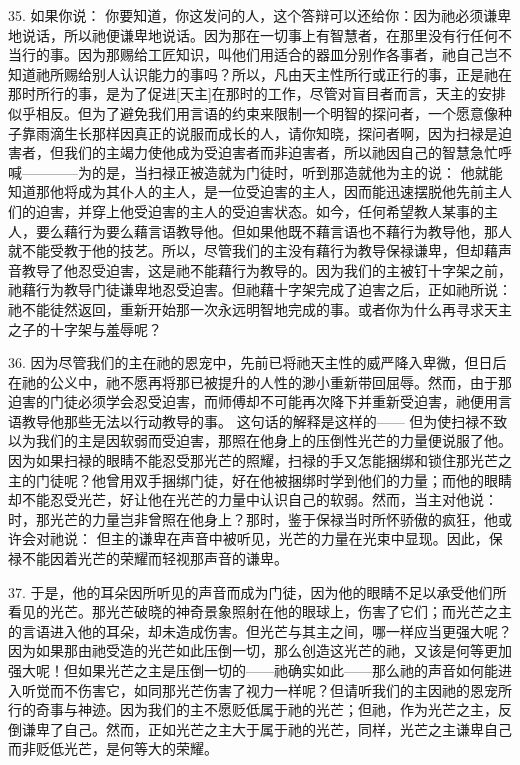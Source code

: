 35. 如果你说： 你要知道，你这发问的人，这个答辩可以还给你：因为祂必须谦卑地说话，所以祂便谦卑地说话。因为那在一切事上有智慧者，在那里没有行任何不当行的事。因为那赐给工匠知识，叫他们用适合的器皿分别作各事者，祂自己岂不知道祂所赐给别人认识能力的事吗？所以，凡由天主性所行或正行的事，正是祂在那时所行的事，是为了促进[天主]在那时的工作，尽管对盲目者而言，天主的安排似乎相反。但为了避免我们用言语的约束来限制一个明智的探问者，一个愿意像种子靠雨滴生长那样因真正的说服而成长的人，请你知晓，探问者啊，因为扫禄是迫害者，但我们的主竭力使他成为受迫害者而非迫害者，所以祂因自己的智慧急忙呼喊————为的是，当扫禄正被造就为门徒时，听到那造就他为主的说： 他就能知道那他将成为其仆人的主人，是一位受迫害的主人，因而能迅速摆脱他先前主人们的迫害，并穿上他受迫害的主人的受迫害状态。如今，任何希望教人某事的主人，要么藉行为要么藉言语教导他。但如果他既不藉言语也不藉行为教导他，那人就不能受教于他的技艺。所以，尽管我们的主没有藉行为教导保禄谦卑，但却藉声音教导了他忍受迫害，这是祂不能藉行为教导的。因为我们的主被钉十字架之前，祂藉行为教导门徒谦卑地忍受迫害。但祂藉十字架完成了迫害之后，正如祂所说： 祂不能徒然返回，重新开始那一次永远明智地完成的事。或者你为什么再寻求天主之子的十字架与羞辱呢？\par

36. 因为尽管我们的主在祂的恩宠中，先前已将祂天主性的威严降入卑微，但日后在祂的公义中，祂不愿再将那已被提升的人性的渺小重新带回屈辱。然而，由于那迫害的门徒必须学会忍受迫害，而师傅却不可能再次降下并重新受迫害，祂便用言语教导他那些无法以行动教导的事。 这句话的解释是这样的—— 但为使扫禄不致以为我们的主是因软弱而受迫害，那照在他身上的压倒性光芒的力量便说服了他。因为如果扫禄的眼睛不能忍受那光芒的照耀，扫禄的手又怎能捆绑和锁住那光芒之主的门徒呢？他曾用双手捆绑门徒，好在他被捆绑时学到他们的力量；而他的眼睛却不能忍受光芒，好让他在光芒的力量中认识自己的软弱。然而，当主对他说：时，那光芒的力量岂非曾照在他身上？那时，鉴于保禄当时所怀骄傲的疯狂，他或许会对祂说： 但主的谦卑在声音中被听见，光芒的力量在光束中显现。因此，保禄不能因着光芒的荣耀而轻视那声音的谦卑。\par

37. 于是，他的耳朵因所听见的声音而成为门徒，因为他的眼睛不足以承受他们所看见的光芒。那光芒破晓的神奇景象照射在他的眼球上，伤害了它们；而光芒之主的言语进入他的耳朵，却未造成伤害。但光芒与其主之间，哪一样应当更强大呢？因为如果那由祂受造的光芒如此压倒一切，那么创造这光芒的祂，又该是何等更加强大呢！但如果光芒之主是压倒一切的——祂确实如此——那么祂的声音如何能进入听觉而不伤害它，如同那光芒伤害了视力一样呢？但请听我们的主因祂的恩宠所行的奇事与神迹。因为我们的主不愿贬低属于祂的光芒；但祂，作为光芒之主，反倒谦卑了自己。然而，正如光芒之主大于属于祂的光芒，同样，光芒之主谦卑自己而非贬低光芒，是何等大的荣耀。\par

